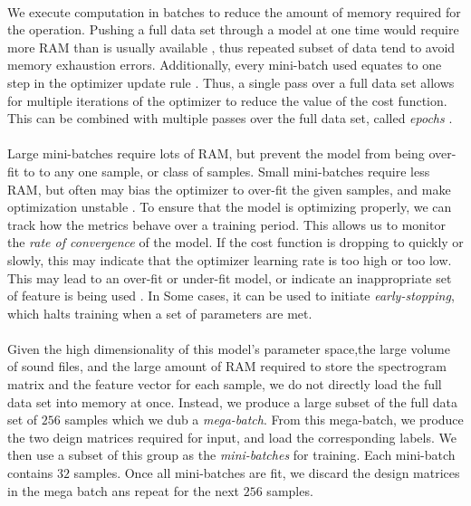 \documentclass[12pt,letterpaper]{article}
\begin{document}
\paragraph{}We execute computation in batches to reduce the amount of memory required for the operation. Pushing a full data set through a model at one time would require more RAM than is usually available , thus repeated subset of data tend to avoid memory exhaustion errors. Additionally, every mini-batch used equates to one step in the optimizer update rule \cite{Goodfellow}. Thus, a single pass over a full data set allows for multiple iterations of the optimizer to reduce the value of the cost function. This can be combined with multiple passes over the full data set, called \textit{epochs} \cite{James,Loy}.

\paragraph*{}Large mini-batches require lots of RAM, but prevent the model from being over-fit to to any one sample, or class of samples. Small mini-batches require less RAM, but often may bias the optimizer to over-fit the given samples, and make optimization unstable \cite{Geron,James}. To ensure that the model is optimizing properly, we can track how the metrics behave over a training period. This allows us to monitor the \textit{rate of convergence} of the model. If the cost function is dropping to quickly or slowly, this may indicate that the optimizer learning rate is too high or too low. This may lead to an over-fit or under-fit model, or indicate an inappropriate set of feature is being used \cite{Geron,Goodfellow}. In Some cases, it can be used to initiate \textit{early-stopping}, which halts training when a set of parameters are met. 

\paragraph*{}Given the high dimensionality of this model's parameter space,the large volume of sound files, and the large amount of RAM required to store the spectrogram matrix and the feature vector for each sample, we do not directly load the full data set into memory at once. Instead, we produce a large subset of the full data set of $256$ samples which we dub a \textit{mega-batch}. From this mega-batch, we produce the two deign matrices required for input, and load the corresponding labels. We then use a subset of this group as the \textit{mini-batches} for training. Each mini-batch contains $32$ samples. Once all mini-batches are fit, we discard the design matrices in the mega batch ans repeat for the next $256$ samples. 
\end{document}
